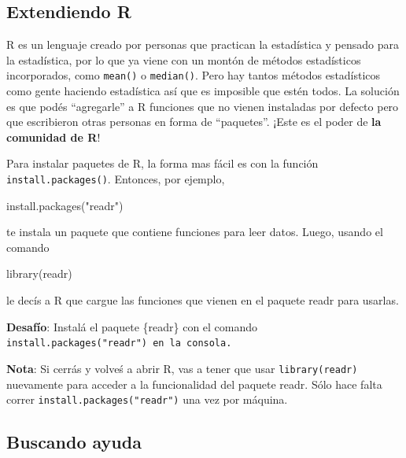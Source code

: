 \documentclass[
  openany]{book}
\newenvironment{Shaded}{\begin{snugshade}}{\end{snugshade}}
\newcommand{\FunctionTok}[1]{\textcolor[rgb]{0.00,0.00,0.00}{#1}}
\newcommand{\NormalTok}[1]{#1}
\newcommand{\StringTok}[1]{\textcolor[rgb]{0.31,0.60,0.02}{#1}}
\begin{document}
\hypertarget{extendiendo-r}{%
\subsection{Extendiendo R}\label{extendiendo-r}}

R es un lenguaje creado por personas que practican la estadística y pensado para la estadística, por lo que ya viene con un montón de métodos estadísticos incorporados, como \texttt{mean()} o \texttt{median()}.
Pero hay tantos métodos estadísticos como gente haciendo estadística así que es imposible que estén todos.
La solución es que podés ``agregarle'' a R funciones que no vienen instaladas por defecto pero que escribieron otras personas en forma de ``paquetes''.
¡Este es el poder de \textbf{la comunidad de R}!

Para instalar paquetes de R, la forma mas fácil es con la función \texttt{install.packages()}.
Entonces, por ejemplo,

\begin{Shaded}
\begin{Highlighting}[]
\FunctionTok{install.packages}\NormalTok{(}\StringTok{"readr"}\NormalTok{)}
\end{Highlighting}
\end{Shaded}

te instala un paquete que contiene funciones para leer datos.
Luego, usando el comando

\begin{Shaded}
\begin{Highlighting}[]
\FunctionTok{library}\NormalTok{(readr)}
\end{Highlighting}
\end{Shaded}

le decís a R que cargue las funciones que vienen en el paquete readr para usarlas.

\textbf{Desafío}: Instalá el paquete \{readr\} con el comando \texttt{install.packages("readr")\ en\ la\ consola.}

\textbf{Nota}: Si cerrás y volveś a abrir R, vas a tener que usar \texttt{library(readr)} nuevamente para acceder a la funcionalidad del paquete readr.
Sólo hace falta correr \texttt{install.packages("readr")} una vez por máquina.

\hypertarget{buscando-ayuda}{%
\subsection{Buscando ayuda}\label{buscando-ayuda}}
\end{document}
